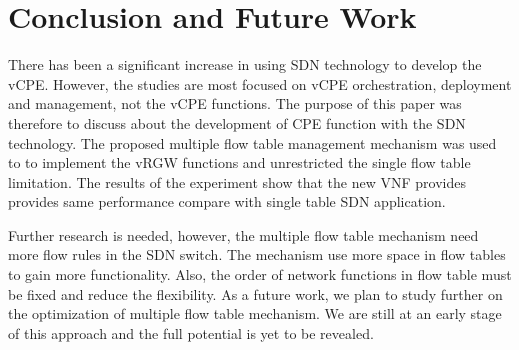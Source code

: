 \chapter{Conclusion and Future Work} \label{ch:conclusion}

There has been a significant increase in using SDN technology to develop the vCPE.
However, the studies are most focused on vCPE orchestration, deployment and management, not the vCPE functions.
The purpose of this paper was therefore to discuss about the development of CPE function with the SDN technology.
The proposed multiple flow table management mechanism was used to to implement the vRGW functions and unrestricted the single flow table limitation.
The results of the experiment show that the new VNF provides provides same performance compare with single table SDN application.

Further research is needed, however, the multiple flow table mechanism need more flow rules in the SDN switch.
The mechanism use more space in flow tables to gain more functionality.
Also, the order of network functions in flow table must be fixed and reduce the flexibility.
As a future work, we plan to study further on the optimization of multiple flow table mechanism. We are still at an early stage of this approach and the full potential is yet to be revealed.
